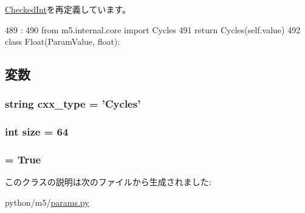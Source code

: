 \hyperlink{classm5_1_1params_1_1CheckedInt_acc340fbd4335fa34f9d57fb454b28ed0}{CheckedInt}を再定義しています。


\begin{DoxyCode}
489                       :
490         from m5.internal.core import Cycles
491         return Cycles(self.value)
492 
class Float(ParamValue, float):
\end{DoxyCode}


\subsection{変数}
\hypertarget{classm5_1_1params_1_1Cycles_a2f1553ebb79374a68b36fdd6d8d82fc3}{
\subsubsection[{cxx\_\-type}]{\setlength{\rightskip}{0pt plus 5cm}string {\bf cxx\_\-type} = '{\bf Cycles}'}}
\label{classm5_1_1params_1_1Cycles_a2f1553ebb79374a68b36fdd6d8d82fc3}
\hypertarget{classm5_1_1params_1_1Cycles_a439227feff9d7f55384e8780cfc2eb82}{
\subsubsection[{size}]{\setlength{\rightskip}{0pt plus 5cm}int {\bf size} = 64}}
\label{classm5_1_1params_1_1Cycles_a439227feff9d7f55384e8780cfc2eb82}
\hypertarget{classm5_1_1params_1_1Cycles_aca40206900cfc164654362fa8d4ad1e6}{
\subsubsection[{unsigned}]{ = True}}
\label{classm5_1_1params_1_1Cycles_aca40206900cfc164654362fa8d4ad1e6}


このクラスの説明は次のファイルから生成されました:\begin{DoxyCompactItemize}
\item 
python/m5/\hyperlink{params_8py}{params.py}\end{DoxyCompactItemize}
